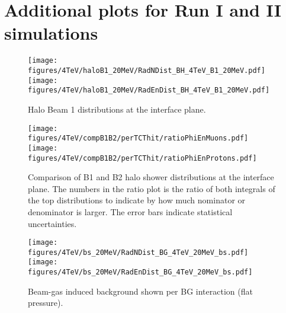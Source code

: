 \section{Additional plots for Run I and II simulations\label{run1run2app}}
\clearpage


\begin{figure}[!htb]
\begin{center}

\texttt{[image: figures/4TeV/haloB1\_20MeV/RadNDist\_BH\_4TeV\_B1\_20MeV.pdf]}
\texttt{[image: figures/4TeV/haloB1\_20MeV/RadEnDist\_BH\_4TeV\_B1\_20MeV.pdf]}

\end{center}
\vspace{-0.6cm}
 \caption{Halo Beam 1 distributions at the interface plane. 
  \label{dist4TeVB12}}
\end{figure}

\begin{figure}%
\begin{center}
\texttt{[image: figures/4TeV/compB1B2/perTCThit/ratioPhiEnMuons.pdf]}
\texttt{[image: figures/4TeV/compB1B2/perTCThit/ratioPhiEnProtons.pdf]}
\end{center}
\vspace{-0.6cm}
\caption{Comparison of B1 and B2 halo shower distributions at the interface plane. The numbers in the ratio plot is the ratio of both integrals of the top distributions to indicate by how much nominator or denominator is larger. The error bars indicate statistical uncertainties.
  \label{comp4TeVB1B2}}
\end{figure}


\begin{figure}%
\begin{center}
\texttt{[image: figures/4TeV/bs\_20MeV/RadNDist\_BG\_4TeV\_20MeV\_bs.pdf]}
\texttt{[image: figures/4TeV/bs\_20MeV/RadEnDist\_BG\_4TeV\_20MeV\_bs.pdf]}
\end{center}
\vspace{-0.6cm}
 \caption{Beam-gas induced background shown per BG interaction (flat pressure).
  \label{dist4TeVBGbs2}}
\end{figure}


